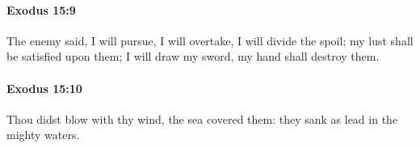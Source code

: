 		\paragraph{Exodus 15:9} %
			\label{EXODUS-15-9}

			The enemy said, I will pursue, I will overtake, I will divide the spoil; my lust shall be satisfied upon them; I will draw my sword, my hand shall destroy them.


		\paragraph{Exodus 15:10} %
			\label{EXODUS-15-10}

			Thou didst blow with thy wind, the sea covered them: they sank as lead in the mighty waters.


